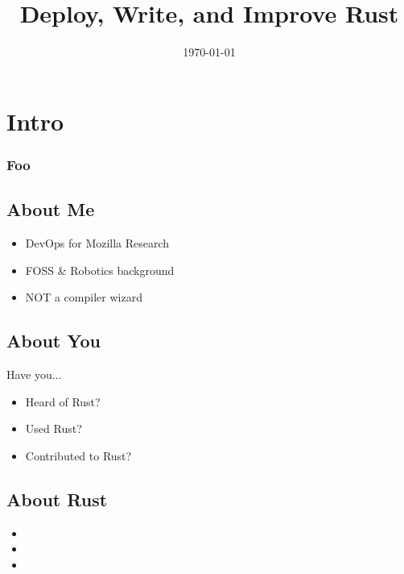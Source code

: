 \documentclass[xcolor={svgnames},hyperref]{beamer}
\title[Rust 101]{Deploy, Write, and Improve Rust}
\author{\name}
\date{\today}
\begin{document}
\begin{frame}
\titlepage
\end{frame}

\section{Intro}

    \begin{frame}
        \frametitle{Foo}
        \tableofcontents
    \end{frame}


    \subsection{About Me}

    \begin{frame}
        \begin{itemize}
            \item DevOps for Mozilla Research
            \item FOSS \& Robotics background
            \item NOT a compiler wizard
        \end{itemize}
    \end{frame}


    \subsection{About You}

    \begin{frame}
        Have you...
        \begin{itemize}
            \item Heard of Rust?
            \item Used Rust?
            \item Contributed to Rust?
        \end{itemize}
    \end{frame}


    \subsection{About Rust}

    \begin{frame}
        \begin{itemize}
            \item
            \item
            \item
        \end{itemize}
    \end{frame}
\end{document}
